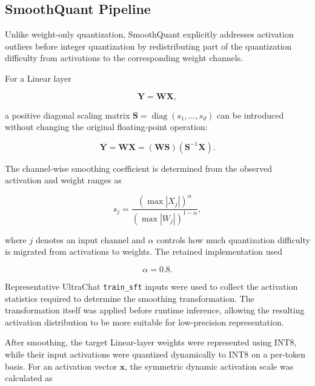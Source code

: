 \subsection{SmoothQuant Pipeline}
Unlike weight-only quantization,
SmoothQuant explicitly addresses activation outliers before integer
quantization by redistributing part of the quantization difficulty from
activations to the corresponding weight channels.

For a Linear layer

\begin{equation}
\mathbf{Y}
=
\mathbf{W}\mathbf{X},
\label{eq:sq-linear}
\end{equation}

a positive diagonal scaling matrix
\(\mathbf{S}=\operatorname{diag}(s_1,\ldots,s_d)\) can be introduced
without changing the original floating-point operation:

\begin{equation}
\mathbf{Y}
=
\mathbf{W}\mathbf{X}
=
\left(\mathbf{W}\mathbf{S}\right)
\left(\mathbf{S}^{-1}\mathbf{X}\right).
\label{eq:sq-equivalent-transform}
\end{equation}

The channel-wise smoothing coefficient is determined from the observed
activation and weight ranges as

\begin{equation}
s_j
=
\frac{
\left(\max |X_j|\right)^{\alpha}
}{
\left(\max |W_j|\right)^{1-\alpha}
},
\label{eq:sq-smoothing-factor}
\end{equation}

where \(j\) denotes an input channel and \(\alpha\) controls how much
quantization difficulty is migrated from activations to weights. The
retained implementation used

\begin{equation}
\alpha = 0.8.
\end{equation}

Representative UltraChat \texttt{train\_sft} inputs were used to
collect the activation statistics required to determine the smoothing
transformation. The transformation itself was applied before runtime
inference, allowing the resulting activation distribution to be more
suitable for low-precision representation.

After smoothing, the target Linear-layer weights were represented using
INT8, while their input activations were quantized dynamically to INT8
on a per-token basis. For an activation vector \(\mathbf{x}\), the
symmetric dynamic activation scale was calculated as

